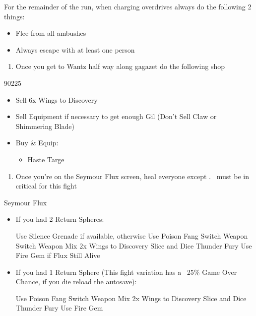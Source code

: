 \begin{encounters}
	For the remainder of the run, when charging overdrives always do the following 2 things:
	\begin{itemize}
		\item Flee from all ambushes
		\item Always escape with at least one person
	\end{itemize}
\end{encounters}
\begin{enumerate}[resume]
	\item Once you get to Wantz half way along gagazet do the following shop
\end{enumerate}
\begin{shop}{90225}
	\begin{itemize}
		\item Sell 6x Wings to Discovery
		\item Sell Equipment if necessary to get enough Gil (Don't Sell Claw or Shimmering Blade)
		\item Buy \& Equip:
		\begin{itemize}
			\item Haste Targe
		\end{itemize}
	\end{itemize}
\end{shop}
\begin{enumerate}[resume]
	\item Once you're on the Seymour Flux screen, heal everyone except \rikku. \rikku\ must be in critical for this fight
\end{enumerate}
\begin{battle}[70000]{Seymour Flux}
	\begin{itemize}
		\item If you had 2 Return Spheres:
			\begin{itemize}
				\rikkuf Use Silence Grenade if available, otherwise Use Poison Fang
				\tidusf Switch Weapon
				\luluf Switch Weapon
				\rikkuf Mix 2x Wings to Discovery
				\tidusf Slice and Dice
				\luluf Thunder Fury
				\rikkuf Use Fire Gem if Flux Still Alive
			\end{itemize}
		\item If you had 1 Return Sphere (This fight variation has a ~25\% Game Over Chance, if you die reload the autosave):
			\begin{itemize}
				\rikkuf Use Poison Fang
				\tidusf Switch Weapon
				\rikkuf Mix 2x Wings to Discovery
				\tidusf Slice and Dice
				\luluf Thunder Fury
				\rikkuf Use Fire Gem
			\end{itemize}
	\end{itemize}
\end{battle}
